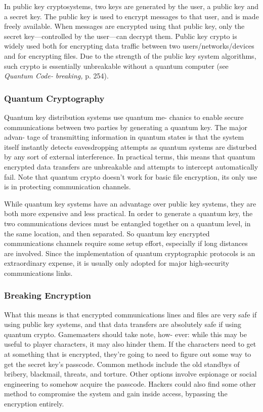 In public key cryptosystems, two keys are generated 
by the user, a public key and a secret key. The public 
key is used to encrypt messages to that user, and is 
made freely available. When messages are encrypted 
using that public key, only the secret key—controlled 
by the user—can decrypt them. Public key crypto is 
widely used both for encrypting data traffic between 
two users/networks/devices and for encrypting 
files. Due to the strength of the public key system 
algorithms, such crypto is essentially unbreakable 
without a quantum computer (see \textit{Quantum Code-}
\textit{breaking,} p. 254).

\subsubsection{Quantum Cryptography}

Quantum key distribution systems use quantum me-
chanics to enable secure communications between two 
parties by generating a quantum key. The major advan-
tage of transmitting information in quantum states is 
that the system itself instantly detects eavesdropping 
attempts as quantum systems are disturbed by any sort 
of external interference. In practical terms, this means 
that quantum encrypted data transfers are unbreakable 
and attempts to intercept automatically fail. Note that 
quantum crypto doesn't work for basic file encryption, 
its only use is in protecting communication channels.

While quantum key systems have an advantage over 
public key systems, they are both more expensive and 
less practical. In order to generate a quantum key, 
the two communications devices must be entangled 
together on a quantum level, in the same location, 
and then separated. So quantum key encrypted 
communications channels require some setup effort, 
especially if long distances are involved. Since the 
implementation of quantum cryptographic protocols 
is an extraordinary expense, it is usually only adopted 
for major high-security communications links.

\subsubsection{Breaking Encryption}

What this means is that encrypted communications 
lines and files are very safe if using public key systems, 
and that data transfers are absolutely safe if using 
quantum crypto. Gamemasters should take note, how-
ever: while this may be useful to player characters, it 
may also hinder them. If the characters need to get at 
something that is encrypted, they're going to need to 
figure out some way to get the secret key's passcode. 
Common methods include the old standbys of bribery, 
blackmail, threats, and torture. Other options involve 
espionage or social engineering to somehow acquire 
the passcode. Hackers could also find some other 
method to compromise the system and gain inside 
access, bypassing the encryption entirely.

